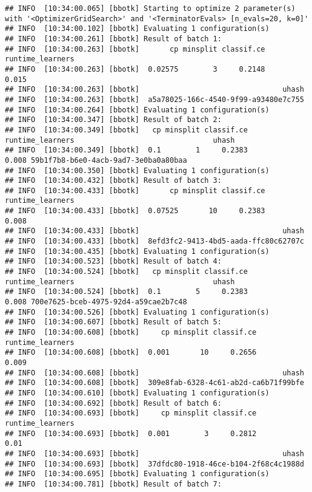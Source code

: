 \documentclass[
]{scrbook}
\begin{document}
\begin{verbatim}
## INFO  [10:34:00.065] [bbotk] Starting to optimize 2 parameter(s) with '<OptimizerGridSearch>' and '<TerminatorEvals> [n_evals=20, k=0]' 
## INFO  [10:34:00.102] [bbotk] Evaluating 1 configuration(s) 
## INFO  [10:34:00.261] [bbotk] Result of batch 1: 
## INFO  [10:34:00.263] [bbotk]       cp minsplit classif.ce runtime_learners 
## INFO  [10:34:00.263] [bbotk]  0.02575        3     0.2148            0.015 
## INFO  [10:34:00.263] [bbotk]                                 uhash 
## INFO  [10:34:00.263] [bbotk]  a5a78025-166c-4540-9f99-a93480e7c755 
## INFO  [10:34:00.264] [bbotk] Evaluating 1 configuration(s) 
## INFO  [10:34:00.347] [bbotk] Result of batch 2: 
## INFO  [10:34:00.349] [bbotk]   cp minsplit classif.ce runtime_learners                                uhash 
## INFO  [10:34:00.349] [bbotk]  0.1        1     0.2383            0.008 59b1f7b8-b6e0-4acb-9ad7-3e0ba0a80baa 
## INFO  [10:34:00.350] [bbotk] Evaluating 1 configuration(s) 
## INFO  [10:34:00.432] [bbotk] Result of batch 3: 
## INFO  [10:34:00.433] [bbotk]       cp minsplit classif.ce runtime_learners 
## INFO  [10:34:00.433] [bbotk]  0.07525       10     0.2383            0.008 
## INFO  [10:34:00.433] [bbotk]                                 uhash 
## INFO  [10:34:00.433] [bbotk]  8efd3fc2-9413-4bd5-aada-ffc80c62707c 
## INFO  [10:34:00.435] [bbotk] Evaluating 1 configuration(s) 
## INFO  [10:34:00.523] [bbotk] Result of batch 4: 
## INFO  [10:34:00.524] [bbotk]   cp minsplit classif.ce runtime_learners                                uhash 
## INFO  [10:34:00.524] [bbotk]  0.1        5     0.2383            0.008 700e7625-bceb-4975-92d4-a59cae2b7c48 
## INFO  [10:34:00.526] [bbotk] Evaluating 1 configuration(s) 
## INFO  [10:34:00.607] [bbotk] Result of batch 5: 
## INFO  [10:34:00.608] [bbotk]     cp minsplit classif.ce runtime_learners 
## INFO  [10:34:00.608] [bbotk]  0.001       10     0.2656            0.009 
## INFO  [10:34:00.608] [bbotk]                                 uhash 
## INFO  [10:34:00.608] [bbotk]  309e8fab-6328-4c61-ab2d-ca6b71f99bfe 
## INFO  [10:34:00.610] [bbotk] Evaluating 1 configuration(s) 
## INFO  [10:34:00.692] [bbotk] Result of batch 6: 
## INFO  [10:34:00.693] [bbotk]     cp minsplit classif.ce runtime_learners 
## INFO  [10:34:00.693] [bbotk]  0.001        3     0.2812             0.01 
## INFO  [10:34:00.693] [bbotk]                                 uhash 
## INFO  [10:34:00.693] [bbotk]  37dfdc80-1918-46ce-b104-2f68c4c1988d 
## INFO  [10:34:00.695] [bbotk] Evaluating 1 configuration(s) 
## INFO  [10:34:00.781] [bbotk] Result of batch 7: 

\end{verbatim}
\end{document}
